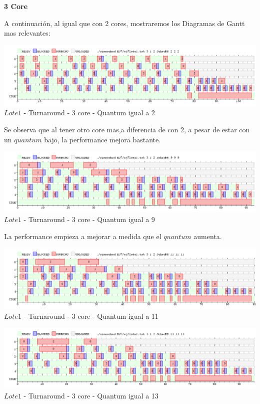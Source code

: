   \begin{center}
   \textbf{3 Core}
   \end{center}
   \indent A continuación, al igual que con 2 cores, mostraremos los Diagramas de Gantt mas relevantes:
   
   \begin{center}
    	\includegraphics[width=450pt]{./EJ7/ej7tour3core1quan.png}
	{$Lote 1$ - Turnaround - 3 core - Quantum igual a 2}	
 \end{center}

 \indent Se observa que al tener otro core mas,a diferencia de con 2, a pesar de estar con un $quantum$ bajo,
 la performance mejora bastante.\\ 
 
   \begin{center}
    	\includegraphics[width=450pt]{./EJ7/ej7tour3core4quan.png}
	{$Lote 1$ - Turnaround - 3 core - Quantum igual a 9}	
 \end{center}
 
 
 \indent La performance empieza a mejorar a medida que el $quantum$ aumenta.
 
   \begin{center}
    	\includegraphics[width=450pt]{./EJ7/ej7tour3core5quan.png}
	{$Lote 1$ - Turnaround - 3 core - Quantum igual a 11}	
 \end{center}
  
   \begin{center}
    	\includegraphics[width=450pt]{./EJ7/ej7tour7core6quan.png}
	{$Lote 1$ - Turnaround - 3 core - Quantum igual a 13}	
 \end{center}
 
